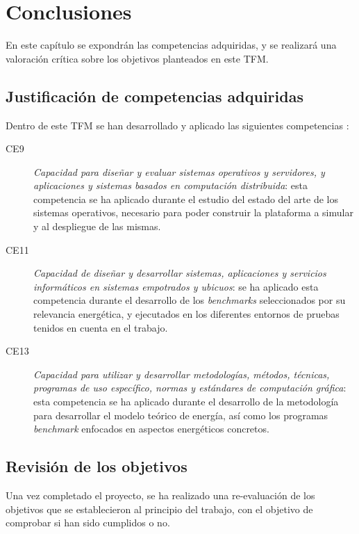 \chapter{Conclusiones}
\label{cap:Conclusiones}

En este capítulo se expondrán las competencias adquiridas, y se realizará una valoración crítica sobre los objetivos planteados en este TFM.

\section{Justificación de competencias adquiridas}

Dentro de este \ac{TFM} se han desarrollado y aplicado las siguientes competencias \cite{objetivos}: 

\begin{description}
\item [CE9] \emph{Capacidad para diseñar y evaluar sistemas operativos y servidores, y aplicaciones y sistemas basados en computación distribuida}: esta competencia se ha aplicado durante el estudio del estado del arte de los sistemas operativos, necesario para poder construir la plataforma a simular y al despliegue de las mismas.

\item[CE11] \emph{Capacidad de diseñar y desarrollar sistemas, aplicaciones y servicios informáticos en sistemas empotrados y ubicuos}: se ha aplicado esta competencia durante el desarrollo de los \textit{benchmarks} seleccionados por su relevancia energética, y ejecutados en los diferentes entornos de pruebas tenidos en cuenta en el trabajo.

\item [CE13] \emph{Capacidad para utilizar y desarrollar metodologías, métodos, técnicas, programas de uso específico, normas y estándares de computación gráfica}: esta competencia se ha aplicado durante el desarrollo de la metodología para desarrollar el modelo teórico de energía, así como los programas \textit{benchmark} enfocados en aspectos energéticos concretos.

\end{description}

\section{Revisión de los objetivos}

Una vez completado el proyecto, se ha realizado una re-evaluación de los objetivos que se establecieron al principio del trabajo, con el objetivo de comprobar si han sido cumplidos o no.

